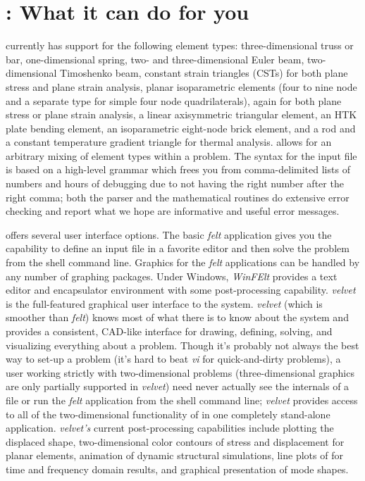 \section{\felt{}: What it can do for you}
\felt{} currently has support for the following element types:
three-dimensional truss or bar, one-dimensional spring, two- and 
three-dimensional Euler 
beam, two-dimensional Timoshenko beam, constant strain
triangles (CSTs) for both plane stress and plane strain analysis, planar 
isoparametric elements (four to nine node and a separate type for simple
four node quadrilaterals), again for both plane stress or plane strain
analysis, a linear axisymmetric triangular element, an HTK plate bending 
element, an isoparametric eight-node brick
element, and a rod and a constant temperature gradient triangle for thermal
analysis.  \felt{} allows for an arbitrary mixing of element types within a
problem.  The syntax
for the \felt{} input file is based on a high-level grammar which frees 
you from comma-delimited lists of numbers and hours of debugging due to
not having the right number after the right comma; both the parser and the
mathematical routines do extensive error checking and report what we hope
are informative and useful error messages.

\felt{} offers several user interface options.  The basic {\em felt}
application gives you the capability to define an input file in a
favorite editor and then solve the problem from the shell command line.
Graphics for the {\em felt} applications can be handled by any number of
graphing packages.   Under Windows, {\em WinFElt} provides a text
editor and encapsulator environment with some post-processing capability.
{\em velvet} is the full-featured graphical user interface to the 
\felt{} system.  {\em velvet} (which is
smoother than {\em felt}) knows most of what there is to know about the
\felt{} system and provides a consistent, CAD-like interface for drawing,
defining, solving, and visualizing everything about a problem.  Though it's
probably not always the best way to set-up a problem (it's hard to beat
{\em vi} for quick-and-dirty problems), a user working strictly with 
two-dimensional problems (three-dimensional graphics are only partially
supported in {\em velvet}) need never actually see the internals of a
\felt{} file or run the {\em felt} application from the shell command line;
{\em velvet} provides access to all of the two-dimensional functionality of
\felt{} in one completely stand-alone application.  {\em velvet's} current
post-processing capabilities include plotting the displaced shape,
two-dimensional color contours of stress and displacement for planar elements,
animation of dynamic structural simulations, line plots of for 
time and frequency domain results, and graphical presentation of mode shapes.

